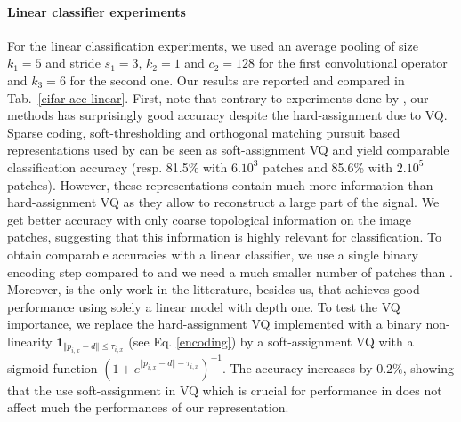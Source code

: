 \documentclass{article} %
\begin{document}
\paragraph{Linear classifier experiments}  For the linear classification experiments, we used an average pooling of size $k_1=5$ and stride $s_1=3$, $k_2=1$ and $c_2=128$ for the first convolutional operator and $k_3=6$ for the second one.
Our results are reported and compared in Tab.~\ref{cifar-acc-linear}. First, note that contrary to experiments done by \cite{coates2011analysis}, our methods has surprisingly good accuracy despite the hard-assignment due to VQ.
Sparse coding, soft-thresholding and orthogonal matching pursuit based representations used by \cite{coates2011importance, recht2019imagenet} can be seen as soft-assignment VQ and yield comparable classification accuracy (resp. 81.5\% with $6.10^3$ patches and 85.6\% with $2.10^5$ patches).
However, these representations contain much more information than hard-assignment VQ as they allow to reconstruct a large part of the signal.
We get better accuracy with only coarse topological information on the image patches, suggesting that this information is highly relevant for classification.
To obtain comparable accuracies with a linear classifier, we use a single binary encoding step compared to \cite{mairal2016end} and we need a much smaller number of patches than \cite{recht2019imagenet, coates2011importance}.
Moreover, \cite{recht2019imagenet} is the only work in the litterature, besides us, that achieves good performance using solely a linear model with depth one.
To test the VQ importance, we replace the hard-assignment VQ implemented with a binary non-linearity  $\mathbf{1}_{\Vert  p_{i,x} - d\Vert \leq \tau_{i,x}}$ (see Eq. \ref{encoding}) by a soft-assignment VQ with a sigmoid function $(1 + e^{\Vert  p_{i,x} - d\Vert - \tau_{i,x}})^{-1}$.
The accuracy increases by $0.2\%$, showing that the use soft-assignment in VQ which is crucial for performance in \cite{coates2011importance} does not affect much the performances of our representation.
\end{document}
